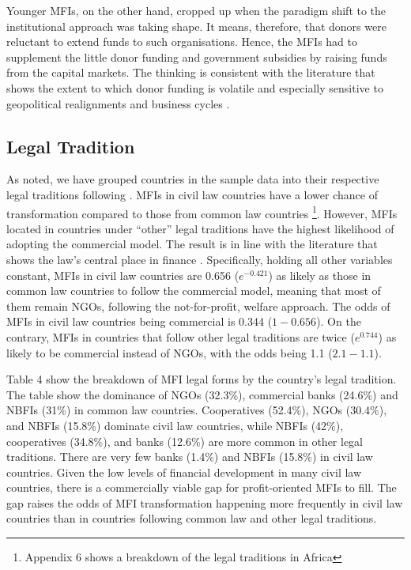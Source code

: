 \documentclass[a4paper,nobind]{templates/ociamthesis}
\begin{document}
Younger MFIs, on the other hand, cropped up when the paradigm shift to the institutional approach was taking shape. It means, therefore, that donors were reluctant to extend funds to such organisations. Hence, the MFIs had to supplement the little donor funding and government subsidies by raising funds from the capital markets. The thinking is consistent with the literature that shows the extent to which donor funding is volatile and especially sensitive to geopolitical realignments \autocite{garmaise2013cheap,d2017aid} and business cycles \autocite{wagner2013vulnerability}.

\hypertarget{legal-tradition}{%
\subsection{Legal Tradition}\label{legal-tradition}}

As noted, we have grouped countries in the sample data into their respective legal traditions following \textcite{oto2014distribution}. MFIs in civil law countries have a lower chance of transformation compared to those from common law countries \footnote{Appendix 6 shows a breakdown of the legal traditions in Africa}. However, MFIs located in countries under ``other'' legal traditions have the highest likelihood of adopting the commercial model. The result is in line with the literature that shows the law's central place in finance \autocite{la2013law}. Specifically, holding all other variables constant, MFIs in civil law countries are 0.656 (\(e^{-0.421}\)) as likely as those in common law countries to follow the commercial model, meaning that most of them remain NGOs, following the not-for-profit, welfare approach. The odds of MFIs in civil law countries being commercial is 0.344 (\(1 - 0.656\)). On the contrary, MFIs in countries that follow other legal traditions are twice (\(e^{0.744}\)) as likely to be commercial instead of NGOs, with the odds being 1.1 (\(2.1 - 1.1\)).

Table 4 show the breakdown of MFI legal forms by the country's legal tradition. The table show the dominance of NGOs (32.3\%), commercial banks (24.6\%) and NBFIs (31\%) in common law countries. Cooperatives (52.4\%), NGOs (30.4\%), and NBFIs (15.8\%) dominate civil law countries, while NBFIs (42\%), cooperatives (34.8\%), and banks (12.6\%) are more common in other legal traditions. There are very few banks (1.4\%) and NBFIs (15.8\%) in civil law countries. Given the low levels of financial development in many civil law countries, there is a commercially viable gap for profit-oriented MFIs to fill. The gap raises the odds of MFI transformation happening more frequently in civil law countries than in countries following common law and other legal traditions.
\end{document}
